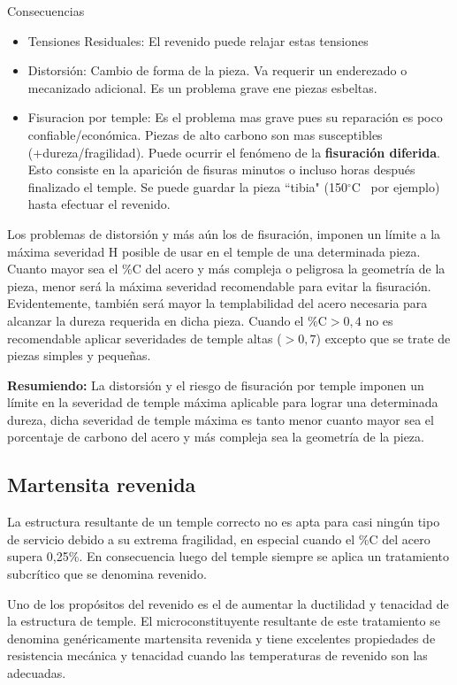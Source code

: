 \documentclass{article}
\newcommand{\grad}{\ensuremath{^\circ \mathrm{C}}}
\begin{document}
Consecuencias
\begin{itemize}
    \item Tensiones Residuales: El revenido puede relajar estas tensiones
    \item Distorsión: Cambio de forma de la pieza. Va requerir un enderezado o mecanizado adicional. Es un problema grave ene piezas esbeltas.
    \item Fisuracion por temple: Es el problema mas grave pues su reparación es poco confiable/económica. Piezas de alto carbono son mas susceptibles (+dureza/fragilidad). Puede ocurrir el fenómeno de la \textbf{fisuración diferida}. Esto consiste en la aparición de fisuras minutos o incluso horas después finalizado el temple. Se puede guardar la pieza ``tibia" (150\grad~ por ejemplo) hasta efectuar el revenido.
\end{itemize}
Los problemas de distorsión y más aún los de fisuración, imponen un límite a la máxima severidad H posible de usar en el temple de una determinada pieza. Cuanto mayor sea el \%C del acero y más compleja o peligrosa la geometría de la pieza, menor será la máxima severidad recomendable para evitar la fisuración. Evidentemente, también será mayor la templabilidad del acero necesaria para alcanzar la dureza requerida en dicha pieza.
Cuando el \%C$>0,4$ no es recomendable aplicar severidades de temple altas ($>0,7$) excepto que se trate de piezas simples y pequeñas.

\textbf{Resumiendo:} La distorsión y el riesgo de fisuración por temple imponen un límite en la severidad de temple máxima aplicable para lograr una determinada dureza, dicha severidad de temple máxima es tanto menor cuanto mayor sea el porcentaje de carbono del acero y más compleja sea la geometría de
la pieza.

\subsection{Martensita revenida}
La estructura resultante de un temple correcto no es apta para casi ningún tipo de servicio debido a su extrema fragilidad, en especial cuando el \%C del acero supera 0,25\%. En consecuencia luego del temple siempre se aplica un tratamiento subcrítico que se denomina revenido.

Uno de los propósitos del revenido es el de aumentar la ductilidad y tenacidad de la estructura de temple. El microconstituyente resultante de este tratamiento se denomina genéricamente martensita revenida y tiene excelentes propiedades de resistencia mecánica y tenacidad cuando las temperaturas de revenido son las adecuadas.
\end{document}
